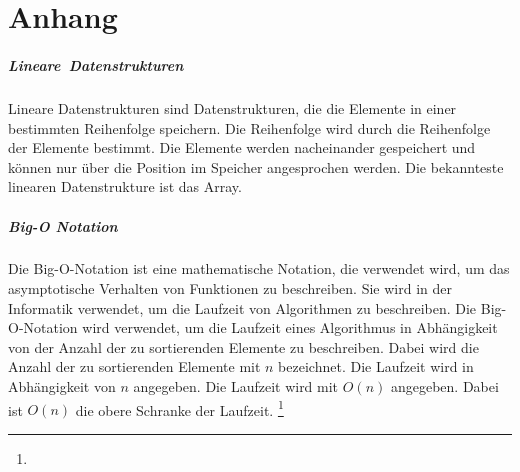 \documentclass[./entry.tex]{subfiles}
\begin{document}
    \chapter{Anhang}

    \paragraph{Lineare\ Datenstrukturen}
    Lineare Datenstrukturen sind Datenstrukturen, die die Elemente in einer bestimmten Reihenfolge speichern. Die
    Reihenfolge wird durch die Reihenfolge der Elemente bestimmt. Die Elemente werden nacheinander gespeichert und
    können nur über die Position im Speicher angesprochen werden. Die bekannteste linearen Datenstrukture ist
    das Array.

    \paragraph{Big-O Notation}
    Die Big-O-Notation ist eine mathematische Notation, die verwendet wird, um das asymptotische Verhalten von
    Funktionen zu beschreiben. Sie wird in der Informatik verwendet, um die Laufzeit von Algorithmen zu beschreiben.
    Die Big-O-Notation wird verwendet, um die Laufzeit eines Algorithmus in Abhängigkeit von der Anzahl der zu
    sortierenden Elemente zu beschreiben. Dabei wird die Anzahl der zu sortierenden Elemente mit $n$ bezeichnet.
    Die Laufzeit wird in Abhängigkeit von $n$ angegeben. Die Laufzeit wird mit $O(n)$ angegeben. Dabei ist $O(n)$
    die obere Schranke der Laufzeit.
    \footnote{}

    \begin{multicols}{2}


    \end{multicols}
\end{document}
